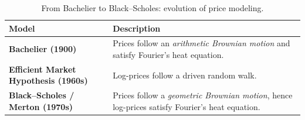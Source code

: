 \begin{table}[H]
\centering
{}
\begin{tabular}{@{}p{3.8cm}p{8.2cm}@{}}
\toprule
\rowcolor{gray!15}
\textbf{Model} & \textbf{Description} \\ \midrule
\textbf{Bachelier (1900)} &
Prices follow an \emph{arithmetic Brownian motion} and satisfy Fourier's heat equation. \\[2pt]
\textbf{Efficient Market Hypothesis (1960s)} &
Log-prices follow a driven random walk. \\[2pt]
\textbf{Black–Scholes / Merton (1970s)} &
Prices follow a \emph{geometric Brownian motion}, hence log-prices satisfy Fourier's heat equation. \\ 
\bottomrule
\end{tabular}
\caption{From Bachelier to Black–Scholes: evolution of price modeling.}
\end{table}

